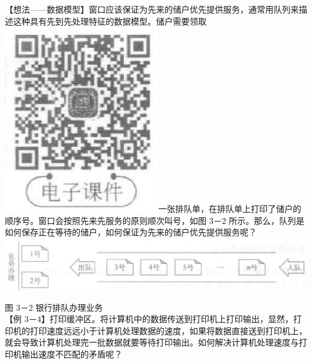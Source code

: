 \documentclass[10pt]{article}
\begin{document}
【想法——数据模型】窗口应该保证为先来的储户优先提供服务，通常用队列来描述这种具有先到先处理特征的数据模型。储户需要领取\\
\includegraphics[max width=\textwidth]{2025_06_06_704745ea57b15b2333e5g-083(1)}一张排队单，在排队单上打印了储户的顺序号。窗口会按照先来先服务的原则顺次叫号，如图 3－2 所示。那么，队列是如何保存正在等待的储户，如何保证为先来的储户优先提供服务呢？\\
\includegraphics[max width=\textwidth, center]{2025_06_06_704745ea57b15b2333e5g-084}

图 3－2 银行排队办理业务\\
【例 3－4】打印缓冲区。将计算机中的数据传送到打印机上打印输出，显然，打印机的打印速度远远小于计算机处理数据的速度，如果将数据直接送到打印机上，就会导致计算机处理完一批数据就要等待打印输出。如何解决计算机处理速度与打印机输出速度不匹配的矛盾呢？
\end{document}

